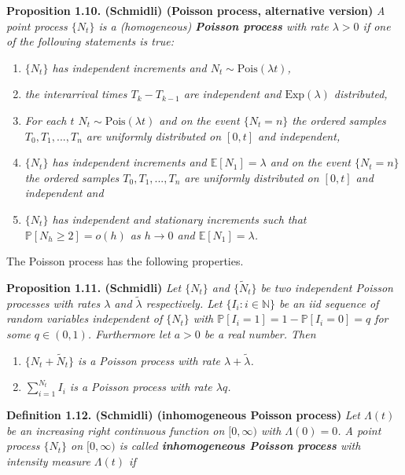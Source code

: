 \documentclass[a4paper,12pt,openany]{book}
\providecommand{\tightlist}{%
 \setlength{\itemsep}{0pt}\setlength{\parskip}{0pt}}
\begin{document}
\textbf{Proposition 1.10. (Schmidli) (Poisson process, alternative version)} \emph{A point process \(\{N_t\}\) is a (homogeneous) \textbf{Poisson process} with rate \(\lambda >0\) if one of the following statements is true:}

\begin{enumerate}
\def\labelenumi{\roman{enumi})}
\tightlist
\item
  \emph{\(\{N_t\}\) has independent increments and \(N_t\sim \text{Pois}(\lambda t)\),}
\item
  \emph{the interarrival times \(T_k-T_{k-1}\) are independent and \(\text{Exp}(\lambda)\) distributed,}
\item
  \emph{For each \(t\) \(N_t\sim \text{Pois}(\lambda t)\) and on the event \(\{N_t=n\}\) the ordered samples \(T_0,T_1,...,T_n\) are uniformly distributed on \([0,t]\) and independent,}
\item
  \emph{\(\{N_t\}\) has independent increments and \(\mathbb E[N_1]=\lambda\) and on the event \(\{N_t=n\}\) the ordered samples \(T_0,T_1,...,T_n\) are uniformly distributed on \([0,t]\) and independent and}
\item
  \emph{\(\{N_t\}\) has independent and stationary increments such that \(\mathbb P[N_h\ge 2]=o(h)\) as \(h\to 0\) and \(\mathbb E[N_1]=\lambda\).}
\end{enumerate}

The Poisson process has the following properties.

\textbf{Proposition 1.11. (Schmidli)} \emph{Let \(\{N_t\}\) and \(\{\tilde N_t\}\) be two independent Poisson processes with rates \(\lambda\) and \(\tilde\lambda\) respectively. Let \(\{I_i : i \in \mathbb N\}\) be an iid sequence of random variables independent of \(\{N_t\}\) with \(\mathbb P[I_i = 1] = 1−\mathbb P[I_i = 0] = q\) for some \(q \in (0,1)\). Furthermore let \(a > 0\) be a real number. Then}

\begin{enumerate}
\def\labelenumi{\roman{enumi})}
\tightlist
\item
  \emph{\(\{N_t+\tilde N_t\}\) is a Poisson process with rate \(\lambda +\tilde \lambda\).}
\item
  \emph{\(\sum_{i=1}^{N_t}I_i\) is a Poisson process with rate \(\lambda q\).}
\end{enumerate}

\textbf{Definition 1.12. (Schmidli) (inhomogeneous Poisson process)} \emph{Let \(\Lambda(t)\) be an increasing right continuous function on \([0,\infty)\) with \(\Lambda(0) = 0\). A point process \(\{N_t\}\) on \([0, \infty)\) is called \textbf{inhomogeneous Poisson process} with intensity measure \(\Lambda(t)\) if}
\end{document}
